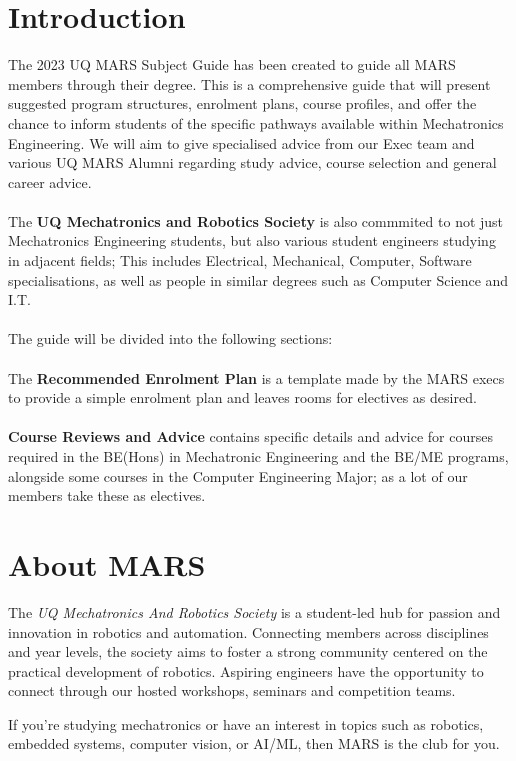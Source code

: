\documentclass[a4paper,12pt]{report}
\begin{document}
\chapter{Introduction}
    The 2023 UQ MARS Subject Guide has been created to guide all MARS members through their degree. This is a comprehensive guide that will present suggested program structures, enrolment plans, course profiles, and offer the chance to inform students of the specific pathways available within Mechatronics Engineering. We will aim to give specialised advice from our Exec team and various UQ MARS Alumni regarding study advice, course selection and general career advice. \\
    \\ The \textbf{UQ Mechatronics and Robotics Society} is also commmited to not just Mechatronics Engineering students, but also various student engineers studying in adjacent fields; This includes Electrical, Mechanical, Computer, Software specialisations, as well as people in similar degrees such as Computer Science and I.T. \\
    \\ The guide will be divided into the following sections: \\
    \\ The \textbf{Recommended Enrolment Plan} is a template made by the MARS execs to provide a simple enrolment plan and leaves rooms for electives as desired. \\
    \\ \textbf{Course Reviews and Advice} contains specific details and advice for courses required in the BE(Hons) in Mechatronic Engineering and the BE/ME programs, alongside some courses in the Computer Engineering Major; as a lot of our members take these as electives. \\
    
\chapter{About MARS}
The \textit{UQ Mechatronics And Robotics Society} is a student-led hub for passion and innovation in robotics and automation.
Connecting members across disciplines and year levels, the society aims to foster a strong community centered on the practical development of robotics.
Aspiring engineers have the opportunity to connect through our hosted workshops, seminars and competition teams.

If you're studying mechatronics or have an interest in topics such as robotics, embedded systems, computer vision, or AI/ML, then MARS is the club for you.
\end{document}
